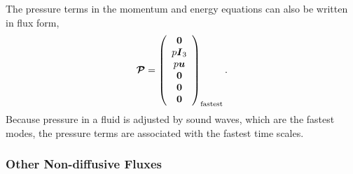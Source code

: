 \documentclass{article}
\begin{document}
The pressure terms in the momentum and energy equations can also be written in flux form,
\begin{equation}
\boldsymbol{{\mathcal{P}}} = \left( \begin{array}{c}
\boldsymbol{{0}} \\
p \boldsymbol{{I}}_3 \\
p \boldsymbol{{u}} \\
\boldsymbol{{0}} \\
\boldsymbol{{0}} \\
\boldsymbol{{0}} 
\end{array}
\right)_{\mathrm{fastest}}.
\end{equation}
Because pressure in a fluid is adjusted by sound waves, which are the fastest modes, the pressure terms are associated with the fastest time scales. 

\subsubsection{Other Non-diffusive Fluxes}
\end{document}
